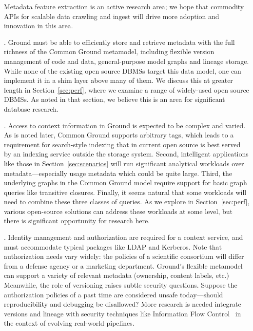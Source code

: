 \documentclass{cidr-2017}
\begin{document}
Metadata feature extraction is an active research area; we hope that commodity APIs for scalable data crawling and ingest will drive more adoption and innovation in this area. 

.  Ground must be able to efficiently store and retrieve metadata with the full richness of the Common Ground metamodel, including flexible version management of code and data, general-purpose model graphs and lineage storage. 
While none of the existing open source DBMSs target this data model, one can implement it in a shim layer above many of them. 
We discuss this at greater length in Section~\ref{sec:perf}, where we examine a range of widely-used open source DBMSs. As noted in that section, we believe this is an area for significant database research.

.  Access to context information in Ground is expected to be complex and varied. As is noted later, Common Ground supports arbitrary tags, which leads to a requirement for search-style indexing that in current open source is best served by
an indexing service outside the storage system.
Second, intelligent applications like those in Section~\ref{sec:scenarios} will run significant analytical workloads over metadata---especially usage metadata which could be quite large.  
Third, the underlying graphs in the Common Ground model require support for basic graph queries like transitive closures. 
Finally, it seems natural that some workloads will need to combine these three classes of queries.
As we explore in Section~\ref{sec:perf}, various open-source solutions can address these workloads at some level, but there is significant opportunity for research here.

.  
Identity management and authorization are required for a context service, and must accommodate typical packages like LDAP and Kerberos.  
Note that authorization needs vary widely: the policies of a scientific consortium will differ from a defense agency or a marketing department.  
Ground's flexible metamodel can support a variety of relevant metadata (ownership, content labels, etc.) 
Meanwhile, the role of versioning raises
subtle security questions.
Suppose the authorization policies of a past time are considered unsafe today---should reproducibility and debugging be disallowed? 
More research is needed integrate
versions and lineage 
with security techniques like Information Flow Control~\cite{myers1999jflow} in the context of evolving real-world pipelines.
\end{document}
